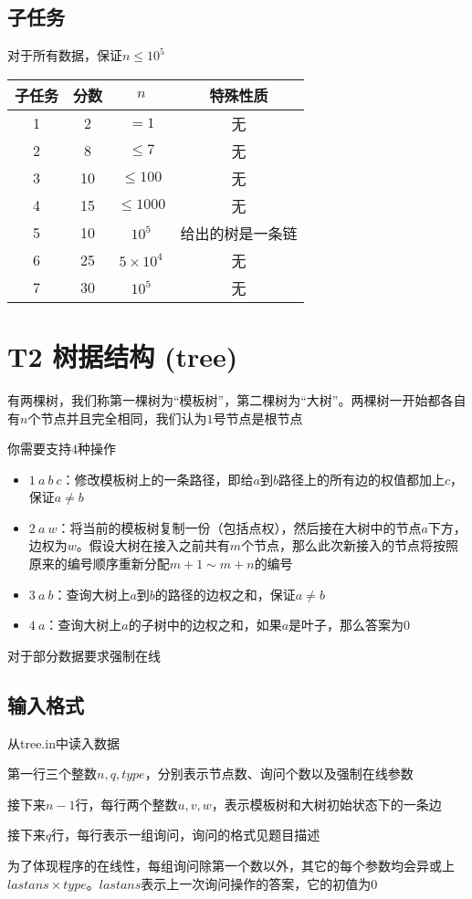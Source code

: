 \documentclass[12pt]{article}
\begin{document}
	\subsection{子任务}
	对于所有数据，保证$n\leq 10^5$\par
	\begin{table}[H]
		\centering
		\begin{tabular}{cccc}
			\toprule
			子任务 & 分数  & $n$ & 特殊性质\\
			\midrule
			1 & 2 & $= 1$ & 无 \\
			\midrule
			2 & 8 & $\leq 7$ & 无 \\
			\midrule
			3 & 10 & $\leq 100$ & 无 \\
			\midrule
			4 & 15 & $\leq 1000$ & 无 \\
			\midrule
			5 & 10 & $10^5$ & 给出的树是一条链 \\
			\midrule
			6 & 25 & $5\times 10^4$ & 无 \\
			\midrule
			7 & 30 & $10^5$ & 无 \\
			\bottomrule
		\end{tabular}
	\end{table}\par
	\newpage
	\section{T2 树据结构 (tree)}
	有两棵树，我们称第一棵树为“模板树”，第二棵树为“大树”。两棵树一开始都各自有$n$个节点并且完全相同，我们认为$1$号节点是根节点\par
	你需要支持$4$种操作\par
	\begin{itemize}
		\item $1\ a\ b\ c$：修改模板树上的一条路径，即给$a$到$b$路径上的所有边的权值都加上$c$，保证$a\neq b$
		\item $2\ a\ w$：将当前的模板树复制一份（包括点权），然后接在大树中的节点$a$下方，边权为$w$。假设大树在接入之前共有$m$个节点，那么此次新接入的节点将按照原来的编号顺序重新分配$m + 1\sim m + n$的编号
		\item $3\ a\ b$：查询大树上$a$到$b$的路径的边权之和，保证$a\neq b$
		\item $4\ a$：查询大树上$a$的子树中的边权之和，如果$a$是叶子，那么答案为$0$
	\end{itemize}\par
	对于部分数据要求强制在线
	\subsection{输入格式}
	从tree.in中读入数据\par
	第一行三个整数$n, q, type$，分别表示节点数、询问个数以及强制在线参数\par
	接下来$n - 1$行，每行两个整数$u, v, w$，表示模板树和大树初始状态下的一条边\par
	接下来$q$行，每行表示一组询问，询问的格式见题目描述\par
	为了体现程序的在线性，每组询问除第一个数以外，其它的每个参数均会异或上$lastans\times type$。$lastans$表示上一次询问操作的答案，它的初值为$0$
\end{document}
